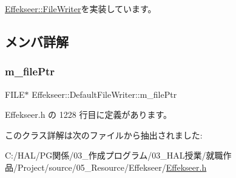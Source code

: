\mbox{\hyperlink{class_effekseer_1_1_file_writer_a7bdd5dc4f70f8e83c03de7e96af5dc27}{Effekseer\+::\+File\+Writer}}を実装しています。



\subsection{メンバ詳解}
\mbox{\label{class_effekseer_1_1_default_file_writer_a66ba60cd1b40e5dfea801758b6d2b307}} 
\subsubsection{\texorpdfstring{m\+\_\+file\+Ptr}{m\_filePtr}}
{\footnotesize\ttfamily F\+I\+LE$\ast$ Effekseer\+::\+Default\+File\+Writer\+::m\+\_\+file\+Ptr\hspace{0.3cm}{\ttfamily [private]}}



 Effekseer.\+h の 1228 行目に定義があります。



このクラス詳解は次のファイルから抽出されました\+:\begin{DoxyCompactItemize}
\item 
C\+:/\+H\+A\+L/\+P\+G関係/03\+\_\+作成プログラム/03\+\_\+\+H\+A\+L授業/就職作品/\+Project/source/05\+\_\+\+Resource/\+Effekseer/\mbox{\hyperlink{_effekseer_8h}{Effekseer.\+h}}\end{DoxyCompactItemize}
